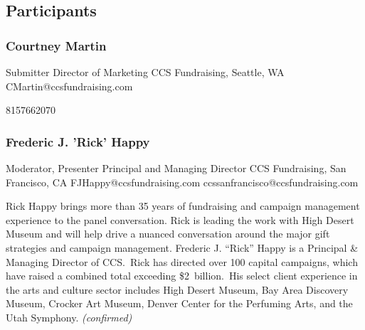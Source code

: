 \documentclass{report}
\begin{document}
            \subsection*{Participants}
              \subsubsection*{ Courtney Martin }
              Submitter\newline
              Director of Marketing\newline
              CCS Fundraising, Seattle, WA
              \newline
              CMartin@ccsfundraising.com\newline
              
              8157662070\newline

              


              
                \subsubsection*{ Frederic J. 'Rick' Happy }
                Moderator, Presenter\newline
                Principal and Managing Director\newline
                CCS Fundraising, San Francisco, CA
                \newline
                FJHappy@ccsfundraising.com\newline
                ccssanfrancisco@ccsfundraising.com\newline

                Rick Happy brings more than 35 years of fundraising and campaign management experience to the panel conversation. Rick is leading the work with High Desert Museum and will help drive a nuanced conversation around the major gift strategies and campaign management. Frederic J. “Rick” Happy is a Principal \& Managing Director of CCS. Rick has directed over 100 capital campaigns, which have raised a combined total exceeding \$2 billion. His select client experience in the arts and culture sector includes High Desert Museum, Bay Area Discovery Museum, Crocker Art Museum, Denver Center for the Perfuming Arts, and the Utah Symphony.\newline
                \emph{ (confirmed) }
              
\end{document}
